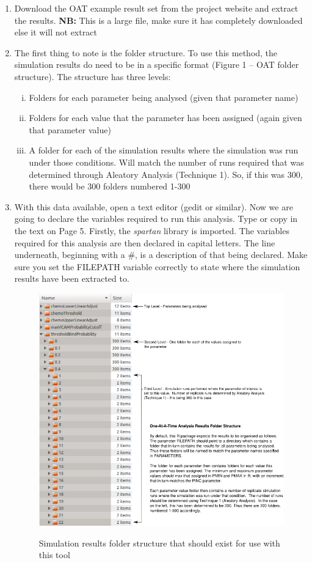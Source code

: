 \documentclass[a4paper,11pt]{article}
\begin{document}
\begin{enumerate}
\item Download the OAT example result set from the project website and extract the results. \textbf{NB:} This is a large file, make sure it has completely downloaded else it will not extract
\item The first thing to note is the folder structure.  To use this method, the simulation results do need to be in a specific format (Figure 1 – OAT folder structure).  The structure has three levels:
\begin{enumerate}[(i)]
\item Folders for each parameter being analysed (given that parameter name)
\item Folders for each value that the parameter has been assigned (again given that parameter value)
\item A folder for each of the simulation results where the simulation was run under those conditions. Will match the number of runs required that was determined through Aleatory Analysis (Technique 1). So, if this was 300, there would be 300 folders numbered 1-300
\end{enumerate}
\item With this data available, open a text editor (gedit or similar).  Now we are going to declare the variables required to run this analysis.  Type or copy in the text on Page 5.  Firstly, the \textit{spartan} library is imported. The variables required for this analysis are then declared in capital letters. The line underneath, beginning with a \#, is a description of that being declared. Make sure you set the FILEPATH variable correctly to state where the simulation results have been extracted to.

\begin{figure}
\centering
    \includegraphics[width=\textwidth]{OAT_Folder_Struc.png}\\ \noindent
    \caption{Simulation results folder structure that should exist for use with this tool}
    \label{OAT_Folders}
    \newpage 
\end{figure}


\end{enumerate}
\end{document}
